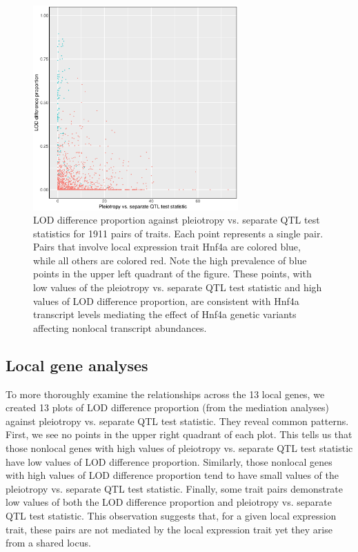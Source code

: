 \documentclass{article}
\begin{document}
\begin{figure}
    \centering
    \includegraphics[width = 0.7\textwidth]{../Rmd/lod-diff-prop-v-lrt.eps}
    \caption{LOD difference proportion against pleiotropy vs. separate QTL test statistics for 1911 pairs of traits. Each point represents a single pair. Pairs that involve local expression trait Hnf4a are colored blue, while all others are colored red. Note the high prevalence of blue points in the upper left quadrant of the figure. These points, with low values of the pleiotropy vs. separate QTL test statistic and high values of LOD difference proportion, are consistent with Hnf4a transcript levels mediating the effect of Hnf4a genetic variants affecting nonlocal transcript abundances.}
    \label{fig:lod-diff-prop-v-lrt-all}
\end{figure}

\subsection{Local gene analyses}

To more thoroughly examine the relationships across the 13 local genes, we created 13 plots of LOD difference proportion (from the mediation analyses) against pleiotropy vs. separate QTL test statistic. They reveal common patterns. First, we see no points in the upper right quadrant of each plot. This tells us that those nonlocal genes with high values of pleiotropy vs. separate QTL test statistic have low values of LOD difference proportion. Similarly, those nonlocal genes with high values of LOD difference proportion tend to have small values of the pleiotropy vs. separate QTL test statistic. Finally, some trait pairs demonstrate low values of both the LOD difference proportion and pleiotropy vs. separate QTL test statistic. This observation suggests that, for a given local expression trait, these pairs are not mediated by the local expression trait yet they arise from a shared locus. 
\end{document}
